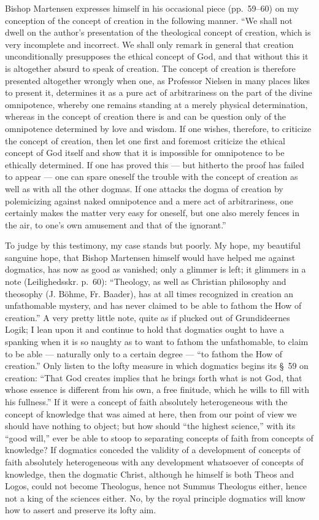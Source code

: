 \documentclass[12pt]{book}
\newcommand{\opage}[1]{\marginnote{\footnotesize\textit{[#1]}}}
\begin{document}
Bishop Martensen expresses himself in his occasional piece (pp.~59--60) on my conception of the concept of creation in the following manner. ``We shall not dwell on the author's presentation of the theological concept of creation, which is very incomplete and incorrect. We shall only remark in general that creation unconditionally presupposes the ethical concept of God, and that without this it is altogether absurd to speak of creation. The concept of creation is therefore presented altogether wrongly when one, as Professor Nielsen in many places likes to present it, determines it as a pure act of arbitrariness on the part of the divine omnipotence, whereby one remains standing at a merely physical determination, whereas in the concept of creation there is and can be question only of the omnipotence determined by love and wisdom. If one wishes, therefore, to criticize the concept of creation, then let one first and foremost criticize the ethical concept of God itself and show that it is impossible for omnipotence to be ethically determined. If one has proved this --- but hitherto the proof has failed to appear --- one can spare oneself the trouble with the concept of creation as well as with all the other dogmas. If one attacks the dogma of creation by polemicizing against naked omnipotence and a mere act of arbitrariness, one certainly makes the matter very easy for oneself, but one also merely fences in the air, to one's own amusement and that of the ignorant.''

To judge by this testimony, my case stands but poorly. My hope, my beautiful sanguine hope, that Bishop Martensen himself would have helped me against dogmatics, has now as good as vanished; only a glimmer is left; it glimmers in a note (Leilighedsskr. p.~60):
\opage{97}\setcounter{footnote}{0}%
``Theology, as well as Christian philosophy and theosophy (J. Böhme, Fr. Baader), has at all times recognized in creation an unfathomable mystery, and has never claimed to be able to fathom the How of creation.'' A very pretty little note, quite as if plucked out of Grundideernes Logik; I lean upon it and continue to hold that dogmatics ought to have a spanking when it is so naughty as to want to fathom the unfathomable, to claim to be able --- naturally only to a certain degree --- ``to fathom the How of creation.'' Only listen to the lofty measure in which dogmatics begins its §~59 on creation: ``That God creates implies that he brings forth what is not God, that whose essence is different from his own, a free finitude, which he wills to fill with his fullness.'' If it were a concept of faith absolutely heterogeneous with the concept of knowledge that was aimed at here, then from our point of view we should have nothing to object; but how should ``the highest science,'' with its ``good will,'' ever be able to stoop to separating concepts of faith from concepts of knowledge? If dogmatics conceded the validity of a development of concepts of faith absolutely heterogeneous with any development whatsoever of concepts of knowledge, then the dogmatic Christ, although he himself is both Theos and Logos, could not become Theologus, hence not Summus Theologus either, hence not a king of the sciences either. No, by the royal principle dogmatics will know how to assert and preserve its lofty aim.
\end{document}
